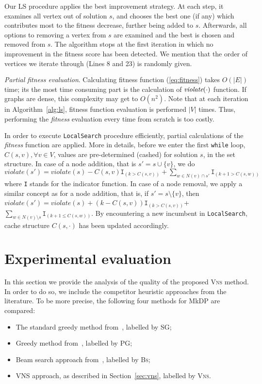 \documentclass[dvipsnames,format=sigconf,anonymous=true,review=true]{acmart}
\begin{document}
Our LS procedure applies the best improvement strategy. At each step, it examines all vertex out of solution $s$, and chooses the best one (if any) which contributes most to the fitness decrease, further being added to $s$. Afterwards, all options to removing a vertex from $s$ are examined and the best is chosen and   removed from $s$.   The algorithm stops at the first iteration  in which no improvement in the fitness score has been detected.  We mention that the order of vertices we iterate through (Lines 8 and 23) is randomly given. 

\emph{Partial fitness evaluation}. Calculating fitness function (\ref{eq:fitness}) takes $O(|E|)$ time; its the most time consuming part is the calculation of $\emph{violate}(\cdot)$  function.   If graphs are dense, this complexity may get to  $O(n^2)$. Note that at each iteration in Algorithm~\ref{alg:ls},  fitness function evaluation is performed $|V|$ times. Thus, performing the \emph{fitness} evaluation every time from scratch is too costly. 

In order to execute \texttt{LocalSearch} procedure  efficiently, partial calculations of the \emph{fitness} function are applied. More in details, before we enter the first \texttt{while} loop, $C(s, v), \forall v \in V$, values are pre-determined (cashed) for solution $s$, in the set structure. In case of a node addition, that is  $s' = s \cup \{v\} $, we do $violate(s') = violate(s) - C(s, v)  \texttt{I}_{(k> C(s,v))}  + \sum_{w\in N(v) \cap s'} \texttt{I}_{(k+1 > C(s, w))}  $ where \texttt{I} stands for the indicator function. 
In case of a node removal, we apply a similar concept as for a node addition, that is, if $s' = s \setminus \{v\}$, then $violate(s') =  violate(s) + ( k - C(s, v)) \texttt{I}_{( k > C(s, v))} $+ $\sum_{ w \in   N(v)  \setminus s} \texttt{I}_{(k+1 \leq C(s, w)) }$. By encountering a new incumbent in \texttt{LocalSearch}, cache structure $C(s, \cdot)$ has been updated accordingly.


\section{Experimental evaluation}\label{sec:experiments}


In this section we provide the analysis of the quality of the proposed \textsc{Vns} method. In order to do so, we include the competitor heuristic approaches from the literature. To be more precise, the following four methods for MkDP are compared:  

\begin{itemize}
	\item The standard greedy method from~\cite{parekh1991analysis,gagarin2013randomized}, labelled by \textsc{SG};
	\item Greedy method from~\cite{gagarin2018multiple}, labelled by \textsc{PG};
	\item Beam search approach from~\cite{corcoran2021heuristics}, labelled by \textsc{Bs};
	\item VNS approach, as described in Section~\ref{sec:vns}, labelled by \textsc{Vns}.  
\end{itemize}
\end{document}
